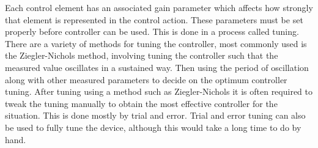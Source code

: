 \documentclass[twoside,a4]{report}
\begin{document}
	Each control element has an associated gain parameter which affects how strongly that element is represented in the control action. These parameters must be set properly before controller can be used. This is done in a process called tuning. There are a variety of methods for tuning the controller, most commonly used is the Ziegler-Nichols method, involving tuning the controller such that the measured value oscillates in a sustained way. Then using the period of oscillation along with other measured parameters to decide on the optimum controller tuning. After tuning using a method such as Ziegler-Nichols it is often required to tweak the tuning manually to obtain the most effective controller for the situation. This is done mostly by trial and error. Trial and error tuning can also be used to fully tune the device, although this would take a long time to do by hand.
	
\end{document}

